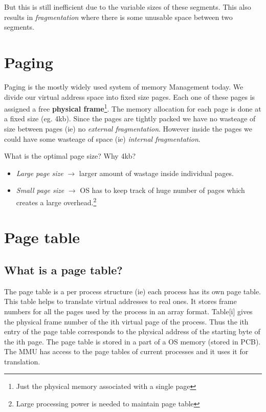 \documentclass[12pt]{article}
\newcommand{\tbox}[1]{\noindent\fbox{\parbox{\textwidth}{#1}}}
\begin{document}
But this is still inefficient due to the variable sizes of these segments. This also results in \textit{fragmentation} where there is some unusable space between two segments. 

\section{Paging}
Paging is the mostly widely used system of memory Management today. We divide our virtual address space into fixed size pages. Each one of these pages is assigned a free \textbf{physical frame}\footnote{Just the physical memory associated with a single page}.
The memory allocation for each page is done at a fixed size (eg. 4kb). Since the pages are tightly packed we have no wasteage of size between pages (ie) no \textit{external fragmentation}. However inside the pages we could have some wasteage of space (ie) \textit{internal fragmentation}.

What is the optimal page size? Why 4kb?
\begin{itemize}[topsep=0pt, partopsep=0pt, itemsep=0pt, parsep=0pt]
    \item \textit{Large page size} \(\rightarrow\) larger amount of wastage inside individual pages.
    \item \textit{Small page size} \(\rightarrow\) OS has to keep track of huge number of pages which creates a large overhead.\footnote{Large processing power is needed to maintain page table}
\end{itemize}
\newpage

\noindent\tbox{
    \begin{center}
    \textbf{\Huge Lecture 13}
    \end{center}
}
\section{Page table}
\subsection*{What is a page table?}
The page table is a per process structure (ie) each process has its own page table. This table helps to translate
virtual addresses to real ones. It stores frame numbers for all the pages used by the process in an array format. 
Table[i] gives the physical frame number of the ith virtual page of the process. Thus the ith entry of the page table corresponds to the physical address of the starting byte of the ith page. The page table is stored in a part of a OS memory (stored in PCB). The MMU has 
access to the page tables of current processes and it uses it for translation. 
\end{document}

